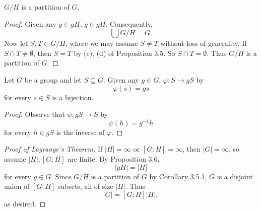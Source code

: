 \documentclass[pmath347]{subfiles}
\begin{document}
    \begin{cor}{}
        $G /H$ is a partition of $G$.
    \end{cor}	

    \begin{proof}
        Given any $g\in gH$, $g\in gH$. Consequently,
        \begin{equation*}
            \bigcup G /H = G. 
        \end{equation*}
        Now let $S,T\in G /H$, where we may assume $S\neq T$ without loss of generality. If $S\cap T\neq\emptyset$, then $S=T$ by (c), (d) of Proposition 3.5. So $S\cap T=\emptyset$. Thus $G /H$ is a partition of $G$.
    \end{proof}

    \begin{prop}{}
        Let $G$ be a group and let $S\subseteq G$. Given any $g\in G$, $\varphi:S\to gS$ by
        \begin{equation*}
            \varphi\left( s \right) = gs
        \end{equation*}
        for every $s\in S$ is a bijection.
    \end{prop}

    \begin{proof}
        Observe that $\psi:gS\to S$ by
        \begin{equation*}
            \psi\left( h \right) = g^{-1} h
        \end{equation*}
        for every $h\in gS$ is the inverse of $\varphi$.
    \end{proof}

    \begin{proof}[Proof of Lagrange's Theorem]
        If $\left| H \right| = \infty$ or $\left[ G:H \right] =\infty$, then $\left| G \right| = \infty$, so assume $\left| H \right| , \left[ G:H \right]$ are finite. By Proposition 3.6,
        \begin{equation*}
            \left| gH \right| = \left| H \right| 
        \end{equation*}
        for every $g\in G$. Since $G /H$ is a partition of $G$ by Corollary 3.5.1, $G$ is a disjoint union of $\left[ G:H \right]$ subsets, all of size $\left| H \right|$. Thus
        \begin{equation*}
            \left| G \right| = \left[ G:H \right] \left| H \right| ,
        \end{equation*}
        as desired.
    \end{proof}
\end{document}
